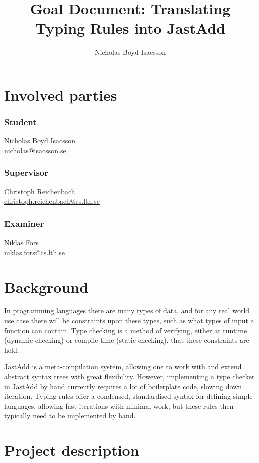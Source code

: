 \documentclass{article}
\title{Goal Document: Translating Typing Rules into JastAdd}
\author{Nicholas Boyd Isacsson}
\begin{document}
\maketitle

\section{Involved parties}
\subsubsection*{Student}
  Nicholas Boyd Isacsson \\
  \href{mailto:nicholas@isacsson.se}{nicholas@isacsson.se}

\subsubsection*{Supervisor}
  Christoph Reichenbach \\
  \href{mailto:christoph.reichenbach@cs.lth.se}{christoph.reichenbach@cs.lth.se}

\subsubsection*{Examiner}
  Niklas Fors \\
  \href{mailto:niklas.fors@cs.lth.se}{niklas.fors@cs.lth.se}

\section{Background}
In programming languages there are many types of data, and for any real world use case there will be constraints upon these types, such as what types of input a function can contain.
Type checking is a method of verifying, either at runtime (dynamic checking) or compile time (static checking), that these constraints are held.

JastAdd is a meta-compilation system, allowing one to work with and extend abstract syntax trees with great flexibility. %
However, implementing a type checker in JastAdd by hand currently requires a lot of boilerplate code, slowing down iteration.
Typing rules offer a condensed, standardised syntax for defining simple languages, allowing fast iterations with minimal work, but these rules then typically need to be implemented by hand.


\section{Project description}
\end{document}

